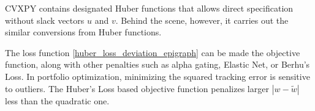 \documentclass[11pt, letterpaper]{article}
\begin{document}


CVXPY \cite{cvxpy} contains designated Huber functions that allows direct specification without slack vectors $u$ and $v$. Behind the scene, however, it carries out the similar conversions from Huber functions.

The loss function \eqref{huber_loss_deviation_epigraph} can be made the objective function, along with other penalties such as
alpha gating, Elastic Net, or Berhu's Loss. In portfolio optimization, minimizing the squared tracking error is sensitive to
outliers. The Huber's Loss based objective function penalizes larger $|w - \tilde{w}|$ less than the quadratic one.


\newpage

\nocite{*}

\end{document}
